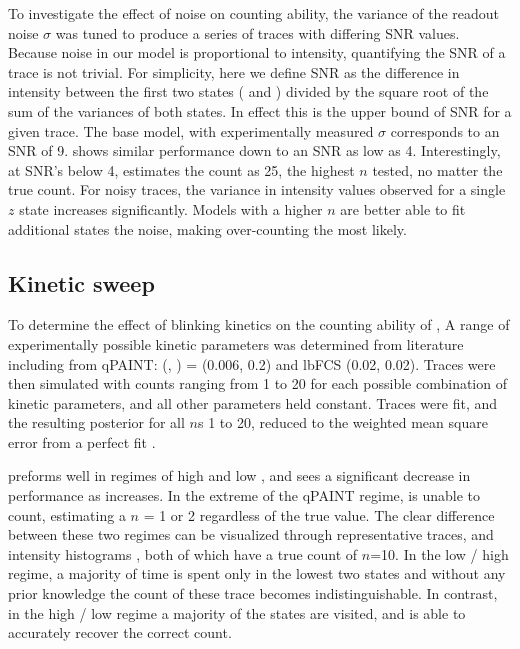 To investigate the effect of noise on counting ability, the variance of the readout noise $\sigma$ was tuned to produce a 
	series of traces with differing SNR values. 
	Because noise in our model is proportional to intensity, quantifying the SNR of a trace 
	is not trivial. 
	For simplicity, here we define SNR as the difference in intensity between 
	the first two states ( and ) divided by the square root of the sum of the variances of both states. 
	In effect this is the upper bound of SNR for a given trace. 
	The base model, with experimentally measured $\sigma$ corresponds to an SNR of 9. 
	\ours shows similar performance down to an SNR as low as 4. Interestingly, at SNR's below 4, \ours
	estimates the count as 25, the highest $n$ tested, no matter the true count. 
	For noisy traces, the variance in intensity values observed for a single $z$ state increases significantly. 
	Models with a higher $n$ are better able to fit additional states the noise, making over-counting the most likely. 


\subsection{Kinetic sweep}
To determine the effect of blinking kinetics on the counting ability of \ours, 
	A range of experimentally possible kinetic parameters was determined from literature including from 
	qPAINT: (\pon, \poff) = (0.006, 0.2) and lbFCS (0.02, 0.02). 
	Traces were then simulated with counts ranging from 1 to 20 
	for each possible combination of kinetic parameters, and all other parameters held constant. 
	Traces were fit, and the resulting posterior for all $n$s 1 to 20, 
	reduced to the weighted mean square error from a perfect fit .
	
\ours preforms well in regimes of high \pon and low \poff, and sees a significant decrease in performance as \poff
	increases. In the extreme of the qPAINT regime, \ours is unable to count, estimating a $n$ = 1 or 2 regardless of the true value.
	The clear difference between these two regimes can be visualized through representative traces, and intensity histograms ,
	both of which have a true count of $n$=10.
	In the low \pon / high \poff regime, a majority of time is spent only in the lowest two states and without 
	any prior knowledge the count of these trace becomes indistinguishable.
	In contrast, in the high \pon / low \poff regime a majority of the states are visited, and \ours 
	is able to accurately recover the correct count.

